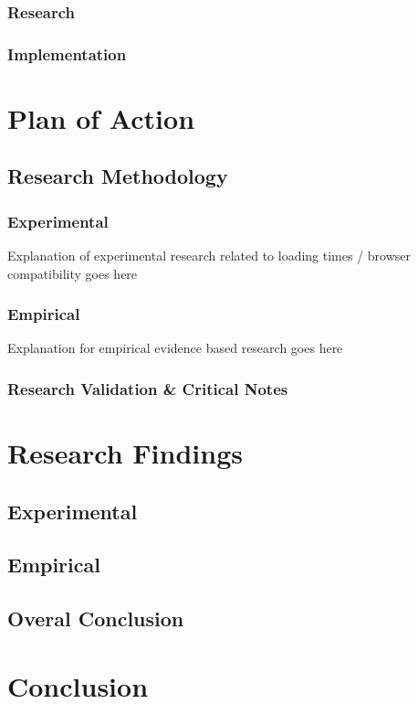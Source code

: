 \documentclass[15pt]{article}
\begin{document}
  	\subsubsection{Research}
  	\subsubsection{Implementation}

\section{Plan of Action}
  \subsection{Research Methodology}
    \subsubsection{Experimental}
    Explanation of experimental research related to loading times / browser compatibility goes here
    \subsubsection{Empirical}
    Explanation for empirical evidence based research goes here
    \subsubsection{Research Validation \& Critical Notes}
    
\section{Research Findings}
	\subsection{Experimental}
	\subsection{Empirical}
	\subsection{Overal Conclusion}



\section{Conclusion}
\end{document}
